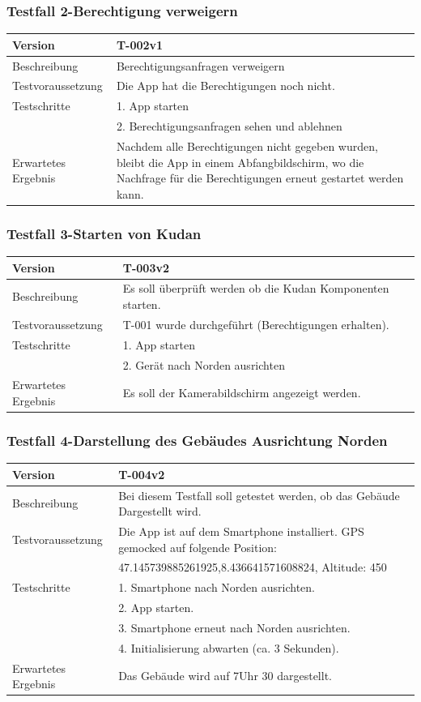 \documentclass[a4paper]{scrreprt}
\begin{document}
\subsubsection{Testfall 2-Berechtigung verweigern}
\begin{tabularx}{\textwidth}{|l|X|}
\hline 
	Version &
	T-002v1 \\ 
\hline 
	Beschreibung & Berechtigungsanfragen verweigern \\ 
\hline 
	Testvoraussetzung & Die App hat die Berechtigungen noch nicht. \\ 
\hline 
	Testschritte &
		1. App starten \\ &
		2. Berechtigungsanfragen sehen und ablehnen \\
\hline
	Erwartetes Ergebnis & Nachdem alle Berechtigungen nicht gegeben wurden, bleibt die App in einem Abfangbildschirm, wo die Nachfrage für die Berechtigungen erneut gestartet werden kann. \\ 
\hline 
\end{tabularx}
\subsubsection{Testfall 3-Starten von Kudan}
\begin{tabularx}{\textwidth}{|l|X|}
\hline 
	Version &
	T-003v2 \\ 
\hline 
	Beschreibung & 
	Es soll überprüft werden ob die Kudan Komponenten starten.\\ 
\hline 
	Testvoraussetzung &
	T-001 wurde durchgeführt (Berechtigungen erhalten). \\ 
\hline 
	Testschritte &
		1. App starten \\ &
		2. Gerät nach Norden ausrichten \\
\hline
	Erwartetes Ergebnis &
	Es soll der Kamerabildschirm angezeigt werden. \\ 
\hline 
\end{tabularx}
\subsubsection{Testfall 4-Darstellung des Gebäudes Ausrichtung Norden}
\begin{tabularx}{\textwidth}{|l|X|}
\hline 
	Version &
	T-004v2 \\ 
\hline 
	Beschreibung & 
	Bei diesem Testfall soll getestet werden, ob das Gebäude Dargestellt wird. \\ 
\hline 
	Testvoraussetzung &
	Die App ist auf dem Smartphone installiert. GPS gemocked auf folgende Position: \\ & 
		47.145739885261925,8.436641571608824, Altitude: 450 \\ 
\hline 
	Testschritte & 
		1. Smartphone nach Norden ausrichten. \\ &
		2. App starten. \\ &
		3. Smartphone erneut nach Norden ausrichten. \\ &
		4. Initialisierung abwarten (ca. 3 Sekunden).\\
\hline
	Erwartetes Ergebnis &
	Das Gebäude wird auf 7Uhr 30 dargestellt. \\ 
\hline 
\end{tabularx}
\end{document}
